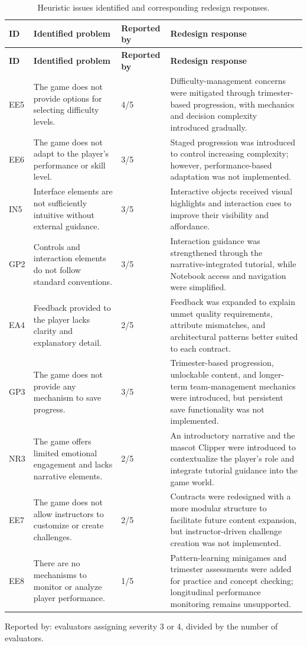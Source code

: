 \begin{longtable}{p{}p{}p{}p{}}
\caption{Heuristic issues identified and corresponding redesign responses.}\label{tab:heuristic-redesign}\\
\hline
\textbf{ID} & \textbf{Identified problem} & \textbf{Reported by} & \textbf{Redesign response} \\
\hline
\endfirsthead
\hline
\textbf{ID} & \textbf{Identified problem} & \textbf{Reported by} & \textbf{Redesign response} \\
\hline
\endhead
EE5 & The game does not provide options for selecting difficulty levels. & 4/5 & Difficulty-management concerns were mitigated through trimester-based progression, with mechanics and decision complexity introduced gradually. \\
EE6 & The game does not adapt to the player's performance or skill level. & 3/5 & Staged progression was introduced to control increasing complexity; however, performance-based adaptation was not implemented. \\
IN5 & Interface elements are not sufficiently intuitive without external guidance. & 3/5 & Interactive objects received visual highlights and interaction cues to improve their visibility and affordance. \\
GP2 & Controls and interaction elements do not follow standard conventions. & 3/5 & Interaction guidance was strengthened through the narrative-integrated tutorial, while Notebook access and navigation were simplified. \\
EA4 & Feedback provided to the player lacks clarity and explanatory detail. & 2/5 & Feedback was expanded to explain unmet quality requirements, attribute mismatches, and architectural patterns better suited to each contract. \\
GP3 & The game does not provide any mechanism to save progress. & 3/5 & Trimester-based progression, unlockable content, and longer-term team-management mechanics were introduced, but persistent save functionality was not implemented. \\
NR3 & The game offers limited emotional engagement and lacks narrative elements. & 2/5 & An introductory narrative and the mascot Clipper were introduced to contextualize the player's role and integrate tutorial guidance into the game world. \\
EE7 & The game does not allow instructors to customize or create challenges. & 2/5 & Contracts were redesigned with a more modular structure to facilitate future content expansion, but instructor-driven challenge creation was not implemented. \\
EE8 & There are no mechanisms to monitor or analyze player performance. & 1/5 & Pattern-learning minigames and trimester assessments were added for practice and concept checking; longitudinal performance monitoring remains unsupported. \\
\hline
\end{longtable}
\noindent\footnotesize Reported by: evaluators assigning severity 3 or 4, divided by the number of evaluators.
